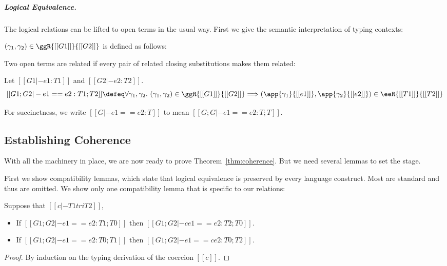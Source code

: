 \subparagraph{Logical Equivalence.}
The logical relations can be lifted to open terms in the usual way. First we give the
semantic interpretation of typing contexts:
\begin{definition}
  $(\gamma_1, \gamma_2) \in \ggR{[[G1]]}{[[G2]]}$ is defined as follows:
\end{definition}
Two open terms are related if every pair of related closing substitutions
makes them related:
\begin{definition}
  Let $[[G1 |- e1 : T1]]$ and $[[G2 |- e2 : T2]]$.
  \[
    [[G1 ; G2 |- e1 == e2 : T1 ; T2]] \defeq \forall \gamma_1, \gamma_2 . \  (\gamma_1, \gamma_2) \in \ggR{[[G1]]}{[[G2]]} \Longrightarrow (\app{\gamma_1}{[[e1]]}, \app{\gamma_2}{[[e2]]}) \in \eeR{[[T1]]}{[[T2]]}
  \]
\end{definition}
For succinctness, we write $[[G |- e1 == e2 : T]]$ to mean $[[G ; G |- e1 == e2 : T ; T]]$.


\subsection{Establishing Coherence}

With all the machinery in place, we are now ready to prove Theorem~\ref{thm:coherence}. But we need
several lemmas to set the stage.

First we show compatibility lemmas, which state that logical equivalence
is preserved by every language construct. Most are standard and thus are
omitted. We show only one compatibility lemma that is specific to our relations:

\begin{lemma}   \label{lemma:co-compa}
  Suppose that $[[c |- T1 tri T2]]$,
  \begin{itemize}
  \item If $[[G1 ; G2 |- e1 == e2 : T1 ; T0]]$ then $[[G1 ; G2 |- c e1 == e2 : T2 ; T0]]$.
  \item If $[[G1 ; G2 |- e1 == e2 : T0 ; T1]]$ then $[[G1 ; G2 |- e1 == c e2 : T0 ; T2]]$.
  \end{itemize}
\end{lemma}
\begin{proof}
  By induction on the typing derivation of the coercion $[[c]]$.
\end{proof}


